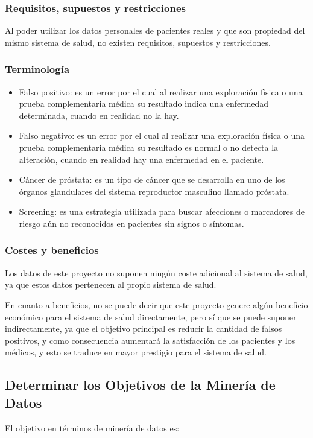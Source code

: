 \documentclass{article}
\begin{document}
\subsubsection{Requisitos, supuestos y restricciones}
Al poder utilizar los datos personales de pacientes reales y que son propiedad del mismo sistema de salud, no existen requisitos, supuestos y restricciones.

\subsubsection{Terminología}

\begin{itemize}
	\item Falso positivo: es un error por el cual al realizar una exploración física o una prueba complementaria médica su resultado indica una enfermedad determinada, cuando en realidad no la hay.
	\item Falso negativo: es un error por el cual al realizar una exploración física o una prueba complementaria médica su resultado es normal o no detecta la alteración, cuando en realidad hay una enfermedad en el paciente.
	\item Cáncer de próstata: es un tipo de cáncer que se desarrolla en uno de los órganos glandulares del sistema reproductor masculino llamado próstata.
	\item Screening: es una estrategia utilizada para buscar afecciones o marcadores de riesgo aún no reconocidos en pacientes sin signos o síntomas.
\end{itemize}

\subsubsection{Costes y beneficios}
Los datos de este proyecto no suponen ningún coste adicional al sistema de salud, ya que estos datos pertenecen al propio sistema de salud.

En cuanto a beneficios, no se puede decir que este proyecto genere algún beneficio económico para el sistema de salud directamente, pero sí que se puede suponer indirectamente, ya que el objetivo principal es reducir la cantidad de falsos positivos, y como consecuencia aumentará la satisfacción de los pacientes y los médicos, y esto se traduce en mayor prestigio para el sistema de salud.

\subsection{Determinar los Objetivos de la Minería de Datos}\label{Objetivos de la Minería de Datos}
El objetivo en términos de minería de datos es:
\end{document}
